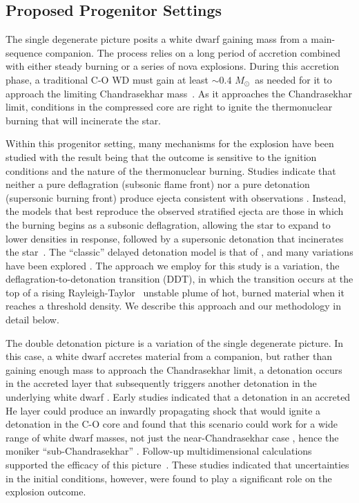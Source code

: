 \documentclass[iop,apj]{emulateapj}
\newcommand{\Msun}{\ensuremath{M_\odot}}
\begin{document}
\subsection{Proposed Progenitor Settings}\label{sec:progenitors}

The single degenerate picture posits a white dwarf gaining mass
from a main-sequence companion. The process relies on a long
period of accretion combined with either steady burning or a
series of nova explosions. During this accretion phase, a traditional
C-O WD must gain at least
$\sim 0.4$ \Msun\ as needed for it to approach the
limiting Chandrasekhar mass~\citep{starrfieldetal2012}. As it approaches
the Chandrasekhar limit, conditions in the compressed core are right
to ignite the thermonuclear burning that will incinerate the star.

Within this progenitor setting, many mechanisms for the explosion have
been studied with the result being that the outcome is sensitive to
the ignition conditions and the nature of the thermonuclear burning.
Studies indicate that neither a pure deflagration (subsonic flame front)
nor a pure detonation (supersonic burning front) produce ejecta consistent
with observations \citep{arnett69,roepkeetal07}.  Instead, the models
that best reproduce the observed stratified ejecta are those in which
the burning begins as a subsonic deflagration, {\color{blue} allowing the star
to expand to lower densities in response, followed} by a
supersonic detonation that incinerates the
star~\citep{Nomo84,Khokhlov1991Delayed-detonat,HoefKhok96,GameKhokOran05}.
The ``classic'' delayed detonation model is that of
\citet{Khokhlov1991Delayed-detonat} \citep[See also][]{hoflich.khokhlov.ea:delayed,GameKhokOran05},
and many variations have been
explored \citep[and references therein]{hillebrandtetal2013,calderetal2013}.
The approach we employ for this study is a variation, the
deflagration-to-detonation transition (DDT), in which the transition
occurs at the top of a rising Rayleigh-Taylor~\citep{taylor+50,chandra+81}
unstable plume of hot, burned
material when it reaches a threshold density.
We describe this approach and our methodology in detail below.

The double detonation picture is a variation of the single degenerate picture.
In this case, a white dwarf accretes material from a companion, but rather
than gaining enough mass to approach the Chandrasekhar limit, a detonation
occurs in the accreted layer that subsequently triggers another detonation
in the underlying white dwarf \citep{woosleyweavertaam80,taam80a,taam80b,
nomoto80,nomoto82b}. Early studies indicated that a detonation in an
accreted He
layer could produce an inwardly propagating
shock that would ignite a detonation in the C-O core and found
that this scenario could work for a wide range of white dwarf
masses, not just the near-Chandrasekhar case \citep{livne90}, hence the
moniker ``sub-Chandrasekhar'' \citep{ww94}.
{\color{blue} Follow-up multidimensional calculations}
supported the
efficacy of this picture~\citep{livneglasner91, livnearnett95,HoefKhok96,
hoeflichetal96, wigginsfalle97,wigginsetal98,garciasenzbravowoosley99}.
These studies indicated that uncertainties in the initial conditions,
however, were found to play a significant role on the explosion outcome.
\end{document}
